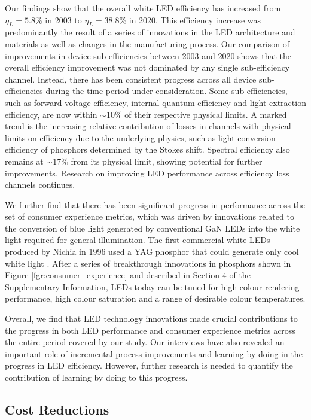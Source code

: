 \documentclass[twoside,twocolumn,9pt]{article}
\begin{document}
Our findings show that the overall white LED efficiency has increased from $\eta_L=5.8\%$ in 2003 to $\eta_L=38.8\%$ in 2020. This efficiency increase was predominantly the result of a series of innovations in the LED architecture and materials as well as changes in the manufacturing process. Our comparison of improvements in device sub-efficiencies between 2003 and 2020 shows that the overall efficiency improvement was not dominated by any single sub-efficiency channel. Instead, there has been consistent progress across all device sub-efficiencies during the time period under consideration. Some sub-efficiencies, such as forward voltage efficiency, internal quantum efficiency and light extraction efficiency, are now within $\sim10\%$ of their respective physical limits. A marked trend is the increasing relative contribution of losses in channels with physical limits on efficiency due to the underlying physics, such as light conversion efficiency of phosphors determined by the Stokes shift. Spectral efficiency also remains at $\sim17\%$ from its physical limit, showing potential for further improvements. Research on improving LED performance across efficiency loss channels continues\cite{cho2017white}\cite{Weisbuch2020}.

We further find that there has been significant progress in performance across the set of consumer experience metrics, which was driven by innovations related to the conversion of blue light generated by conventional GaN LEDs into the white light required for general illumination. The first commercial white LEDs produced by Nichia in 1996 used a YAG phosphor that could generate only cool white light \cite{bando1998development}. After a series of breakthrough innovations in phosphors shown in Figure \ref{fgr:consumer_experience} and described in Section 4 of the Supplementary Information, LEDs today can be tuned for high colour rendering performance, high colour saturation and a range of desirable colour temperatures. 

Overall, we find that LED technology innovations made crucial contributions to the progress in both LED performance and consumer experience metrics across the entire period covered by our study. Our interviews have also revealed an important role of incremental process improvements and learning-by-doing\cite{WRIGHT_1936}\cite{Arrow_1962} in the progress in LED efficiency. However, further research is needed to quantify the contribution of learning by doing to this progress.

\subsection{Cost Reductions}
\end{document}
